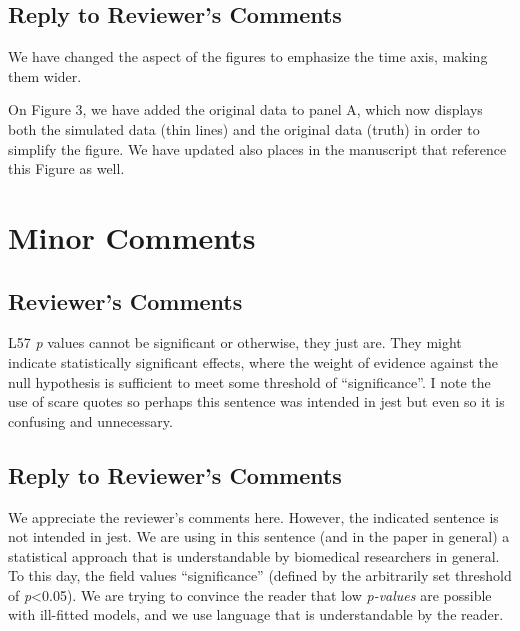 \documentclass[
]{article}
\begin{document}
\hypertarget{section-17}{%
\subsection{\texorpdfstring{\textcolor{reviewersblue} {Reply to Reviewer's Comments}}{}}\label{section-17}}

We have changed the aspect of the figures to emphasize the time axis, making them wider.

On Figure 3, we have added the original data to panel A, which now displays both the simulated data (thin lines) and the original data (truth) in order to simplify the figure. We have updated also places in the manuscript that reference this Figure as well.

\hypertarget{minor-comments}{%
\section{Minor Comments}\label{minor-comments}}

\hypertarget{reviewers-comments-17}{%
\subsection{Reviewer's Comments}\label{reviewers-comments-17}}

L57 \emph{p} values cannot be significant or otherwise, they just are. They might indicate statistically significant effects, where the weight of evidence against the null hypothesis is sufficient to meet some threshold of ``significance''. I note the use of scare quotes so perhaps this sentence was intended in jest but even
so it is confusing and unnecessary.

\hypertarget{section-18}{%
\subsection{\texorpdfstring{\textcolor{reviewersblue} {Reply to Reviewer's Comments}}{}}\label{section-18}}

We appreciate the reviewer's comments here. However, the indicated sentence is not intended in jest. We are using in this sentence (and in the paper in general) a statistical approach that is understandable by biomedical researchers in general. To this day, the field values ``significance'' (defined by the arbitrarily set threshold of \emph{p}\textless0.05). We are trying to convince the reader that low \emph{p-values} are possible with ill-fitted models, and we use language that is understandable by the reader.
\end{document}
